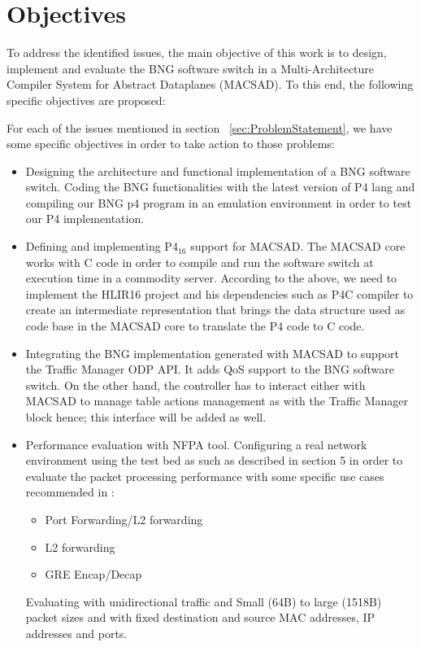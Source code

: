 \section{Objectives}
\label{sec:sec02}
To address the identified issues, the main objective of this work is to design, implement and evaluate the \acrshort{BNG} software switch in a Multi-Architecture Compiler System for Abstract Dataplanes (MACSAD). To this end, the following specific objectives are proposed: 

For each of the issues mentioned in section ~\ref{sec:ProblemStatement}, we have some specific objectives in order to take action to those problems:

\begin{itemize}

\item Designing the architecture and functional implementation of a BNG software switch.  Coding the BNG functionalities with the latest version of P4 lang and compiling our BNG p4 program in an emulation environment in order to test our P4 implementation.

\item Defining and implementing P4$_{16}$ support for MACSAD.  The MACSAD core works with C code in order to compile and run the software switch at execution time in a commodity server. According to the above, we need to implement the HLIR16 project and his dependencies such as P4C compiler to create an intermediate representation that brings the data structure used as code base in the MACSAD core to translate the P4 code to C code.

\item Integrating the BNG implementation generated with MACSAD to support the Traffic Manager ODP API.  It adds QoS support to the BNG software switch.  On the other hand,  the controller has to interact either with MACSAD to manage table actions management as with the Traffic Manager block hence; this interface will be added as well.

\item Performance evaluation with NFPA tool. Configuring a real network environment using the test bed as such as described in section 5 in order to evaluate the packet processing performance with some specific use cases recommended in \cite{nfpa}:
\begin{itemize}
 \item Port Forwarding/L2 forwarding
 \item L2 forwarding
 \item GRE Encap/Decap
\end{itemize}
Evaluating with unidirectional traffic and Small (64B) to large (1518B) packet sizes and with fixed destination and source MAC addresses, IP addresses and ports.


\end{itemize}




